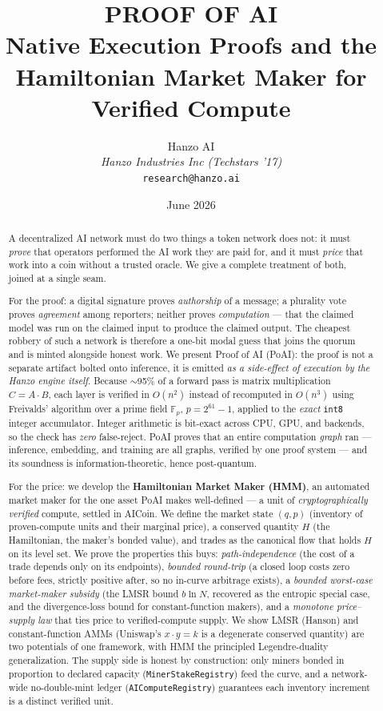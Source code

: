 \documentclass[11pt]{article}
\title{PROOF OF AI\\[0.3em]
{\large Native Execution Proofs and the Hamiltonian Market Maker
for Verified Compute}}
\author{
    Hanzo AI \\
    \textit{Hanzo Industries Inc (Techstars '17)} \\
    \texttt{research@hanzo.ai}
}
\date{June 2026}
\newcommand{\Fp}{\ensuremath{\mathbb{F}_p}}
\newcommand{\code}[1]{\texttt{#1}}
\begin{document}
\hanzocoverpage

\begin{abstract}
A decentralized AI network must do two things a token network does not: it must
\emph{prove} that operators performed the AI work they are paid for, and it must
\emph{price} that work into a coin without a trusted oracle. We give a complete
treatment of both, joined at a single seam.

For the proof: a digital signature proves \emph{authorship} of a message; a
plurality vote proves \emph{agreement} among reporters; neither proves
\emph{computation} --- that the claimed model was run on the claimed input to
produce the claimed output. The cheapest robbery of such a network is therefore a
one-bit modal guess that joins the quorum and is minted alongside honest work. We
present Proof of AI (PoAI): the proof is not a separate artifact bolted onto
inference, it is emitted \emph{as a side-effect of execution by the Hanzo engine
itself}. Because $\sim$95\% of a forward pass is matrix multiplication
$C = A\cdot B$, each layer is verified in $O(n^2)$ instead of recomputed in
$O(n^3)$ using Freivalds' algorithm over a prime field $\Fp$, $p = 2^{61}-1$,
applied to the \emph{exact} \code{int8} integer accumulator. Integer arithmetic
is bit-exact across CPU, GPU, and backends, so the check has \emph{zero}
false-reject. PoAI proves that an entire computation \emph{graph} ran --- inference,
embedding, and training are all graphs, verified by one proof system --- and its
soundness is information-theoretic, hence post-quantum.

For the price: we develop the \textbf{Hamiltonian Market Maker (HMM)}, an
automated market maker for the one asset PoAI makes well-defined --- a unit of
\emph{cryptographically verified} compute, settled in AICoin. We define the market
state $(q,p)$ (inventory of proven-compute units and their marginal price), a
conserved quantity $H$ (the Hamiltonian, the maker's bonded value), and trades as
the canonical flow that holds $H$ on its level set. We prove the properties this
buys: \emph{path-independence} (the cost of a trade depends only on its endpoints),
\emph{bounded round-trip} (a closed loop costs zero before fees, strictly positive
after, so no in-curve arbitrage exists), a \emph{bounded worst-case
market-maker subsidy} (the LMSR bound $b\ln N$, recovered as the entropic special
case, and the divergence-loss bound for constant-function makers), and a
\emph{monotone price--supply law} that ties price to verified-compute supply. We
show LMSR (Hanson) and constant-function AMMs (Uniswap's $x\cdot y=k$ is a
degenerate conserved quantity) are two potentials of one framework, with HMM the
principled Legendre-duality generalization. The supply side is honest by
construction: only miners bonded in proportion to declared capacity
(\code{MinerStakeRegistry}) feed the curve, and a network-wide no-double-mint
ledger (\code{AIComputeRegistry}) guarantees each inventory increment is a distinct
verified unit.


\end{abstract}
\end{document}
